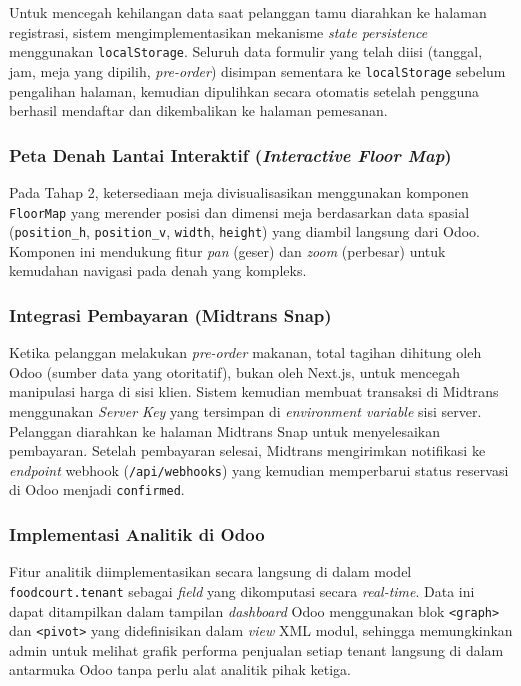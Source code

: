 \documentclass[conference]{IEEEtran}
\begin{document}
Untuk mencegah kehilangan data saat pelanggan tamu diarahkan ke halaman registrasi, sistem mengimplementasikan mekanisme \textit{state persistence} menggunakan \texttt{localStorage}. Seluruh data formulir yang telah diisi (tanggal, jam, meja yang dipilih, \textit{pre-order}) disimpan sementara ke \texttt{localStorage} sebelum pengalihan halaman, kemudian dipulihkan secara otomatis setelah pengguna berhasil mendaftar dan dikembalikan ke halaman pemesanan.

\subsubsection{Peta Denah Lantai Interaktif (\textit{Interactive Floor Map})}
Pada Tahap 2, ketersediaan meja divisualisasikan menggunakan komponen \texttt{FloorMap} yang merender posisi dan dimensi meja berdasarkan data spasial (\texttt{position\_h}, \texttt{position\_v}, \texttt{width}, \texttt{height}) yang diambil langsung dari Odoo. Komponen ini mendukung fitur \textit{pan} (geser) dan \textit{zoom} (perbesar) untuk kemudahan navigasi pada denah yang kompleks.

\subsubsection{Integrasi Pembayaran (Midtrans Snap)}
Ketika pelanggan melakukan \textit{pre-order} makanan, total tagihan dihitung oleh Odoo (sumber data yang otoritatif), bukan oleh Next.js, untuk mencegah manipulasi harga di sisi klien. Sistem kemudian membuat transaksi di Midtrans menggunakan \textit{Server Key} yang tersimpan di \textit{environment variable} sisi server. Pelanggan diarahkan ke halaman Midtrans Snap untuk menyelesaikan pembayaran. Setelah pembayaran selesai, Midtrans mengirimkan notifikasi ke \textit{endpoint} webhook (\texttt{/api/webhooks}) yang kemudian memperbarui status reservasi di Odoo menjadi \texttt{confirmed}.

\subsubsection{Implementasi Analitik di Odoo}
Fitur analitik diimplementasikan secara langsung di dalam model \texttt{foodcourt.tenant} sebagai \textit{field} yang dikomputasi secara \textit{real-time}. Data ini dapat ditampilkan dalam tampilan \textit{dashboard} Odoo menggunakan blok \texttt{<graph>} dan \texttt{<pivot>} yang didefinisikan dalam \textit{view} XML modul, sehingga memungkinkan admin untuk melihat grafik performa penjualan setiap tenant langsung di dalam antarmuka Odoo tanpa perlu alat analitik pihak ketiga.
\end{document}
